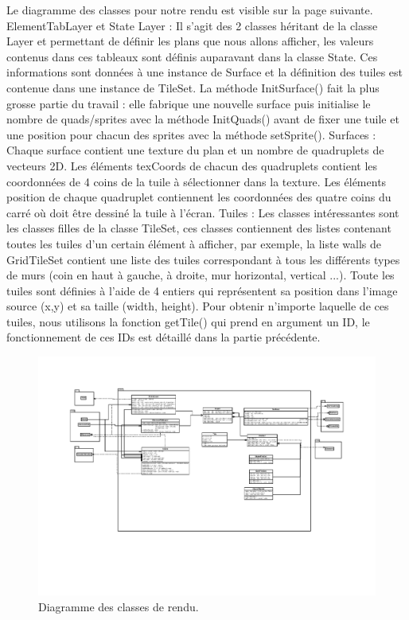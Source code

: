 \documentclass[a4paper,12pt]{article}
\begin{document}
Le diagramme des classes pour notre rendu est visible sur la page suivante.
\bigbreak
ElementTabLayer et State Layer : Il s'agit des 2 classes héritant de la classe Layer et permettant de définir les plans que nous allons afficher, les valeurs contenus dans ces tableaux sont définis auparavant dans la classe State.
Ces informations sont données à une instance de Surface et la définition des tuiles est contenue dans une instance de TileSet.
La méthode InitSurface() fait la plus grosse partie du travail : elle fabrique une nouvelle surface puis initialise le nombre de quads/sprites avec la méthode InitQuads() avant de fixer une tuile et une position pour chacun des sprites avec la méthode setSprite().
\bigbreak
Surfaces : Chaque surface contient une texture du plan et un nombre de quadruplets de vecteurs 2D. Les éléments texCoords de chacun des quadruplets contient les coordonnées de 4 coins de la tuile à sélectionner dans la texture. Les éléments position de chaque quadruplet contiennent les coordonnées des quatre coins du carré où doit être dessiné la tuile à l'écran.
\bigbreak
Tuiles : Les classes intéressantes sont les classes filles de la classe TileSet, ces classes contiennent des listes contenant toutes les tuiles d'un certain élément à afficher, par exemple, la liste walls de GridTileSet contient une liste des tuiles correspondant à tous les différents types de murs (coin en haut à gauche, à droite, mur horizontal, vertical ...).
Toute les tuiles sont définies à l'aide de 4 entiers qui représentent sa position dans l'image source (x,y) et sa taille (width, height).
Pour obtenir n'importe laquelle de ces tuiles, nous utilisons la fonction getTile() qui prend en argument un ID, le fonctionnement de ces IDs est détaillé dans la partie précédente. 

\begin{landscape}
\begin{figure}[p]
\includegraphics[width=0.9\paperheight]{render.pdf}
\caption{\label{uml:render}Diagramme des classes de rendu.} 
\end{figure}
\end{landscape}
\end{document}

